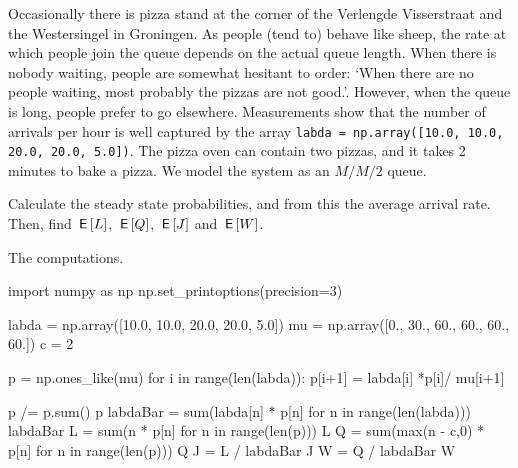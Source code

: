 \documentclass[stochastic-or.tex]{subfiles}
\begin{document}
\begin{exercise}\label{ex:39}
Occasionally there is pizza stand at the corner of the Verlengde Visserstraat and the Westersingel in Groningen.
As people (tend to) behave like sheep, the rate at which people join the queue depends on the actual queue length. When there is nobody waiting, people are somewhat hesitant to order: `When there are no people waiting, most probably the pizzas are not good.'. However, when the queue is long, people prefer to go elsewhere.
Measurements show that the number of arrivals per hour is well captured by the array
\texttt{labda = np.array([10.0, 10.0, 20.0, 20.0, 5.0])}.
The pizza oven can contain two pizzas, and it takes 2 minutes to bake a pizza. We model the system as an $M/M/2$ queue.

Calculate the steady state probabilities, and from this  the average arrival rate. Then, find $\,\mathsf{E}\left[L\right]$, $\,\mathsf{E}\left[Q\right]$, $\,\mathsf{E}\left[J\right]$ and $\,\mathsf{E}\left[W\right]$.
\begin{solution}
The computations.
\begin{pyconsole}[pizza]
import numpy as np
np.set_printoptions(precision=3)

labda = np.array([10.0, 10.0, 20.0, 20.0, 5.0])
mu = np.array([0., 30., 60., 60., 60., 60.])
c = 2

p = np.ones_like(mu)
for i in range(len(labda)):
    p[i+1] = labda[i] *p[i]/ mu[i+1]

p /= p.sum()
p
labdaBar = sum(labda[n] * p[n] for n in range(len(labda)))
labdaBar
L = sum(n * p[n] for n in range(len(p)))
L
Q = sum(max(n - c,0) * p[n] for n in range(len(p)))
Q
J = L / labdaBar
J
W = Q / labdaBar
W
\end{pyconsole}

\end{solution}
\end{exercise}
\end{document}
